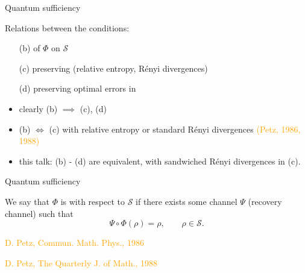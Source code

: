 \documentclass[mathserif]{beamer}
\newcommand{\<}{\langle}
\renewcommand{\>}{\rangle}
\newcommand{\Se}{\mathcal S}
\begin{document}
\begin{frame}{Quantum sufficiency}



Relations between the conditions:
\bigskip

\begin{enumerate}
\item[(b)]  of $\Phi$ on $\Se$
\item[(c)] preserving  (relative entropy, R\'enyi
divergences) %
\item[(d)] preserving optimal errors in  %
\end{enumerate}

\bigskip

\begin{itemize}
\item clearly (b) $\implies$ (c), (d)
\item (b) $\iff$ (c) with relative entropy or standard R\'enyi divergences \hskip 15mm
{\footnotesize \textcolor{orange}{ (Petz, 1986, 1988)}}

\item this talk: (b) - (d) are equivalent, with sandwiched R\'enyi divergences in (c).
\end{itemize}

\end{frame}

\begin{frame}{Quantum sufficiency}

We say that $\Phi$ is
 with respect to $\Se$ if there exists some channel
$\Psi$  (recovery channel) such
that
\[
\Psi\circ \Phi(\rho)=\rho,\qquad \rho\in \Se.
\]




\vfill

{\footnotesize \textcolor{orange}{ D. Petz, Commun. Math. Phys., 1986}

\textcolor{orange}{ D. Petz, The Quarterly J. of Math., 1988}
}
\end{frame}
\end{document}
